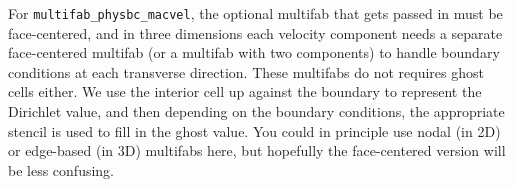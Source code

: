 \documentclass[final]{siamltex}
\begin{document}
For {\tt multifab\_physbc\_macvel}, the optional multifab that gets passed in
must be face-centered, and in three dimensions each velocity component needs
a separate face-centered multifab (or a multifab with two components) to handle
boundary conditions at each transverse direction.  These multifabs do not requires
ghost cells either.  We use the interior cell up against the boundary to represent
the Dirichlet value, and then depending on the boundary conditions, the appropriate
stencil is used to fill in the ghost value.  You could in principle use nodal
(in 2D) or edge-based (in 3D) multifabs here, but hopefully the face-centered 
version will be less confusing.
\end{document}
